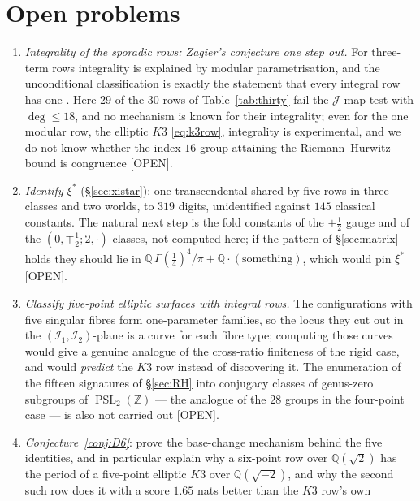 \documentclass[11pt,reqno]{amsart}
\theoremstyle{plain}
\theoremstyle{definition}
\theoremstyle{remark}
\theoremstyle{plain}
\newcommand{\Z}{\mathbb{Z}}
\newcommand{\Q}{\mathbb{Q}}
\DeclareMathOperator{\PSL}{PSL}
\newcommand{\Jm}{\mathcal J}
\newcommand{\Ic}{\mathcal I}
\newcommand{\Open}{\textup{\textsf{[OPEN]}}}
\begin{document}
\section{Open problems}\label{sec:open}

\begin{enumerate}[label=\textup{\arabic*.},leftmargin=2.2em]
\item \emph{Integrality of the sporadic rows: Zagier's conjecture one step out.}
For three-term rows integrality is explained by modular parametrisation, and the
unconditional classification is exactly the statement that every integral row has
one \cite{CLASS,Zagier2009}. Here $29$ of the $30$ rows of
Table~\ref{tab:thirty} fail the $\Jm$-map test with $\deg\le18$, and no mechanism
is known for their integrality; even for the one modular row, the elliptic $K3$
\eqref{eq:k3row}, integrality is experimental, and we do not know whether the
index-$16$ group attaining the Riemann--Hurwitz bound is congruence \Open.
\item \emph{Identify $\xi^*$} (\S\ref{sec:xistar}): one transcendental shared by
five rows in three classes and two worlds, to $319$ digits, unidentified against
$145$ classical constants. The natural next step is the fold constants of the
$+\tfrac12$ gauge and of the $(0,\mp\tfrac12;2,\cdot)$ classes, not computed
here; if the pattern of \S\ref{sec:matrix} holds they should lie in
$\Q\,\Gamma(\tfrac14)^4/\pi+\Q\cdot(\text{something})$, which would pin $\xi^*$
\Open.
\item \emph{Classify five-point elliptic surfaces with integral rows.} The
configurations with five singular fibres form one-parameter families, so the
locus they cut out in the $(\Ic_1,\Ic_2)$-plane is a curve for each fibre type;
computing those curves would give a genuine analogue of the cross-ratio
finiteness of the rigid case, and would \emph{predict} the $K3$ row instead of
discovering it. The enumeration of the fifteen signatures of \S\ref{sec:RH} into
conjugacy classes of genus-zero subgroups of $\PSL_2(\Z)$ --- the analogue of the
$28$ groups in the four-point case --- is also not carried out \Open.
\item \emph{Conjecture~\ref{conj:D6}}: prove the base-change mechanism behind the
five identities, and in particular explain why a six-point row over $\Q(\sqrt2)$
has the period of a five-point elliptic $K3$ over $\Q(\sqrt{-2})$, and why the
second such row does it with a score $1.65$ nats better than the $K3$ row's own

\end{enumerate}
\end{document}

